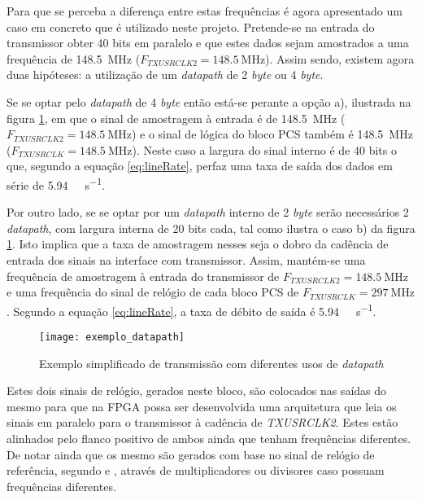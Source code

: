 Para que se perceba a diferença entre estas frequências é agora apresentado um caso em concreto que é utilizado neste projeto. Pretende-se na entrada do transmissor obter 40 bits em paralelo e que estes dados sejam amostrados a uma frequência de \SI{148.5}{\mega\hertz} ($F_{TXUSRCLK2} = \SI{148.5}{\mega\hertz}$). Assim sendo, existem agora duas hipóteses: a utilização de um \textit{datapath} de 2 \textit{byte} ou 4 \textit{byte}.

Se se optar pelo \textit{datapath} de 4 \textit{byte} então está-se perante a opção a), ilustrada na figura \ref{fig:exemplo_datapaths}, em que o sinal de amostragem à entrada é de \SI{148.5}{\mega\hertz} ($F_{TXUSRCLK2} = \SI{148.5}{\mega\hertz}$) e o sinal de lógica do bloco PCS também é \SI{148.5}{\mega\hertz} ($F_{TXUSRCLK} = \SI{148.5}{\mega\hertz}$). Neste caso a largura do sinal interno é de 40 bits o que, segundo a equação \ref{eq:lineRate}, perfaz uma taxa de saída dos dados em série de \SI{5.94}{\giga\bit\per\second}.

Por outro lado, se se optar por um \textit{datapath} interno de 2 \textit{byte} serão necessários 2 \textit{datapath}, com largura interna de 20 bits cada, tal como ilustra o caso b) da figura \ref{fig:exemplo_datapaths}. Isto implica que a taxa de amostragem nesses seja o dobro da cadência de entrada dos sinais na interface com transmissor. Assim, mantém-se uma frequência de amostragem à entrada do transmissor de $F_{TXUSRCLK2} = \SI{148.5}{\mega\hertz}$ e uma frequência do sinal de relógio de cada bloco PCS de $F_{TXUSRCLK} = \SI{297}{\mega\hertz} $. Segundo a equação \ref{eq:lineRate}, a taxa de débito de saída é \SI{5.94}{\giga\bit\per\second}.

\begin{figure}[h!]
 	\begin{center}
 		\leavevmode
 		\texttt{[image: exemplo\_datapath]}
 		\caption[Exemplo simplificado de transmissão com diferentes usos de \textit{datapath}]{Exemplo simplificado de transmissão com diferentes usos de \textit{datapath}}
 		\label{fig:exemplo_datapaths}
 	\end{center}
 \end{figure}

Estes dois sinais de relógio, gerados neste bloco, são colocados nas saídas do mesmo para que na FPGA possa ser desenvolvida uma arquitetura que leia os sinais em paralelo para o transmissor à cadência de \textit{TXUSRCLK2}. Estes estão alinhados pelo flanco positivo de ambos ainda que tenham frequências diferentes. De notar ainda que os mesmo são gerados com base no sinal de relógio de referência, segundo \cite{R011} e \cite{R022}, através de multiplicadores ou divisores caso possuam frequências diferentes.


